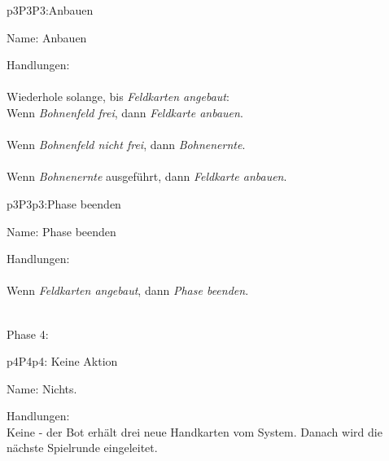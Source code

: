 \begin{description}[leftmargin=5em, style=sameline]
	
	\begin{lhp}{p3}{P3}{P3:Anbauen}
		\item [Name:] Anbauen
		\item [Handlungen:]\hfill\\ 
		\\Wiederhole solange, bis {\itshape Feldkarten angebaut}:
		\\Wenn {\itshape Bohnenfeld frei}, dann 
		{\itshape Feldkarte anbauen}.\\	
		\\Wenn {\itshape Bohnenfeld nicht frei}, dann 
		{\itshape Bohnenernte}.\\
		\\Wenn {\itshape Bohnenernte} ausgeführt, dann 
		{\itshape Feldkarte anbauen}.\\
		
	\end{lhp}
	
	\begin{lhp}{p3}{P3}{p3:Phase beenden}
		\item [Name:] Phase beenden
		\item [Handlungen:]\hfill\\ 
		\\Wenn {\itshape Feldkarten angebaut}, dann 
		{\itshape Phase beenden}.\\
	\end{lhp}
	
\end{description}


\hfill\\ Phase 4:\\
\setcounter{p4}{10}

\begin{description}[leftmargin=5em, style=sameline]
	
	\begin{lhp}{p4}{P4}{p4: Keine Aktion}
		\item [Name:] Nichts.
		\item [Handlungen:]\hfill\\ 
		Keine - der Bot erhält drei neue Handkarten vom System. Danach wird die nächste Spielrunde eingeleitet. 
	\end{lhp}
	
\end{description}



